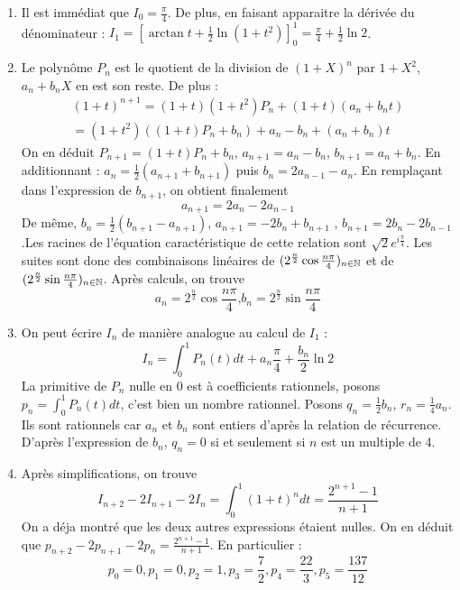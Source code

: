 \begin{enumerate}
\item  Il est imm{\'e}diat que $I_{0}=\frac{\pi }{4}$. De plus, en faisant
apparaitre la d{\'e}riv{\'e}e du d{\'e}nominateur : $I_{1}=\left[ \arctan t+%
\frac{1}{2}\ln (1+t^{2})\right] _{0}^{1}=\frac{\pi
}{4}+\frac{1}{2}\ln 2$.

\item  Le polyn{\^o}me $P_{n}$ est le quotient de la division de $(1+X)^{n}$
par $1+X^{2}$, $a_{n}+b_{n}X$ en est son reste. De plus :
\begin{eqnarray*}
(1+t)^{n+1}=(1+t)(1+t^{2})P_{n}+(1+t)(a_{n}+b_{n}t) \\
=(1+t^{2})\left( (1+t)P_{n}+b_{n}\right)
+a_{n}-b_{n}+(a_{n}+b_{n})t
\end{eqnarray*}
On en d{\'e}duit $P_{n+1}=(1+t)P_{n}+b_{n}$, $a_{n+1}=a_{n}-b_{n}$, $%
b_{n+1}=a_{n}+b_{n}$.\newline
En additionnant : $a_{n}=\frac{1}{2}(a_{n+1}+b_{n+1})$ puis $%
b_{n}=2a_{n-1}-a_{n}$. En rempla\c{c}ant dans l'expression de
$b_{n+1}$, on obtient finalement
\[
a_{n+1}=2a_{n}-2a_{n-1}
\]
De m{\^e}me, $b_{n}=\frac{1}{2}(b_{n+1}-a_{n+1})$, $a_{n+1}=-2b_{n}+b_{n+1}$%
, $b_{n+1}=2b_{n}-2b_{n-1}$.\newline Les racines de l'{\'e}quation
caract{\'e}ristique de cette relation sont $\sqrt{2}e^{i\frac{\pi}{4}}.$ Les suites sont donc des combinaisons lin{\'e}aires de $%
(2^{\frac{n}{2}}\cos \frac{n\pi }{4})_{n\in \N}$ et de $(2^{\frac{n}{%
2}}\sin \frac{n\pi }{4})_{n\in \N}$. Apr{\`e}s calculs, on trouve
\[
a_{n}=2^{\frac{n}{2}}\cos \frac{n\pi }{4}\text{,
}b_{n}=2^{\frac{n}{2}}\sin \frac{n\pi }{4}
\]

\item  On peut {\'e}crire $I_{n}$ de mani{\`e}re analogue au calcul de $I_{1}
$ :
\[
I_{n}=\int_{0}^{1}P_{n}(t)dt+a_{n}\frac{\pi
}{4}+\frac{b_{n}}{2}\ln 2
\]
La primitive de $P_{n}$ nulle en $0$ est {\`a} coefficients
rationnels, posons $p_{n}=\int_{0}^{1}P_{n}(t)dt$, c'est bien un
nombre rationnel$.$ Posons $q_{n}=\frac{1}{2}b_{n}$,
$r_{n}=\frac{1}{4}a_{n}.$ Ils sont rationnels car $a_{n}$ et
$b_{n}$ sont entiers d'apr{\`e}s la relation de r{\'e}currence$.$\newline
D'apr{\`e}s l'expression de $b_{n}$, $q_{n}=0$ si et seulement si $n$
est un multiple de 4$.$

\item  Apr{\`e}s simplifications, on trouve
\[
I_{n+2}-2I_{n+1}-2I_{n}=\int_{0}^{1}(1+t)^{n}dt=\frac{2^{n+1}-1}{n+1}
\]
On a d{\'e}ja montr{\'e} que les deux autres expressions {\'e}taient nulles.%
\newline
On en d{\'e}duit que $p_{n+2}-2p_{n+1}-2p_{n}=\frac{2^{n+1}-1}{n+1}$.
En particulier :
\[
p_{0}=0,p_{1}=0,p_{2}=1,p_{3}=\frac{7}{2},p_{4}=\frac{22}{3},p_{5}=\frac{137%
}{12}
\]


\end{enumerate}
